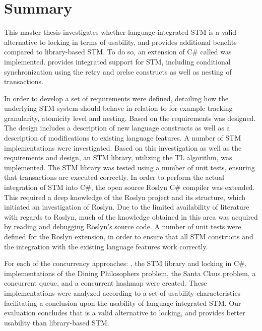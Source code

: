 \chapter[]{Summary}
This master thesis investigates whether language integrated STM is a valid alternative to locking in terms of usability, and provides additional benefits compared to library-based STM. To do so, an extension of C\# called \stmname was implemented. \stmname provides integrated support for STM, including conditional synchronization using the retry and orelse constructs as well as nesting of transactions.

In order to develop \stmname a set of requirements were defined, detailing how the underlying \ac{STM} system should behave in relation to for example tracking granularity, atomicity level and nesting. Based on the requirements \stmname was designed. The design includes a description of new language constructs as well as a description of modifications to existing language features. A number of \ac{STM} implementations were investigated. Based on this investigation as well as the requirements and design, an \ac{STM} library, utilizing the TL algorithm, was implemented. The \ac{STM} library was tested using a number of unit tests, ensuring that transactions are executed correctly. In order to perform the actual integration of \ac{STM} into C\#, the open source Roslyn C\# compiler was extended. This required a deep knowledge of the Roslyn project and its structure, which initiated an investigation of Roslyn. Due to the limited availability of literature with regards to Roslyn, much of the knowledge obtained in this area was acquired by reading and debugging Roslyn's source code. A number of unit tests were defined for the Roslyn extension, in order to ensure that all \ac{STM} constructs and the integration with the existing language features work correctly.

For each of the concurrency approaches: \stmname, the \ac{STM} library and locking in C\#,  implementations of the Dining Philosophers problem, the Santa Claus problem, a concurrent queue, and a concurrent hashmap were created. These implementations were analyzed according to a set of usability characteristics facilitating a conclusion upon the usability of language integrated STM. Our evaluation concludes that \stmname is a valid alternative to locking, and provides better usability than library-based STM.

